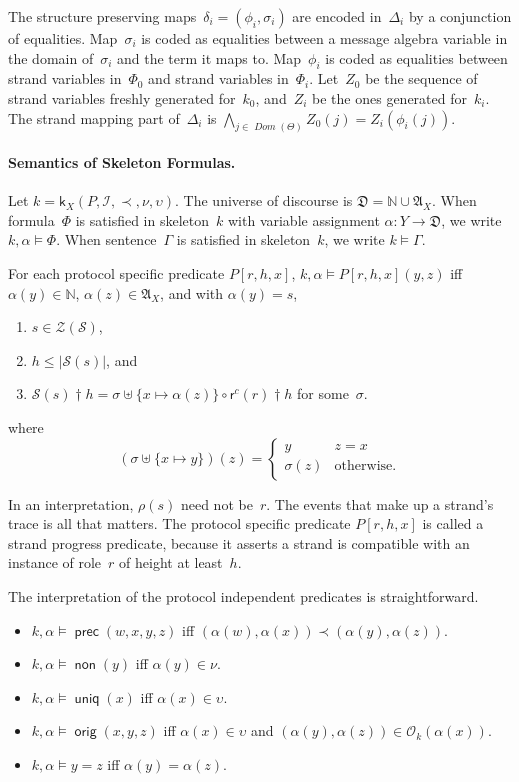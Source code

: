 \documentclass[12pt]{article}
\newcommand{\cn}[1]{\ensuremath{\operatorname{\mathsf{#1}}}}
\newcommand{\fn}[1]{\ensuremath{\operatorname{\mathit{#1}}}}
\newcommand{\sdom}{\fn{Dom}}
\newcommand{\prefix}[2]{#1\dagger#2}
\newcommand{\nat}{\ensuremath{\mathbb{N}}}
\newcommand{\alg}[1]{\ensuremath{\mathfrak{#1}}}
\newcommand{\msg}{\alg{A}}
\newcommand{\ssp}{\ensuremath{\mathcal{S}}}
\newcommand{\strands}{\ensuremath{\mathcal{Z}}}
\newcommand{\rl}{\ensuremath{\rho}}
\newcommand{\skel}{\mathsf{k}}
\newcommand{\insts}{\mathcal{I}}
\newcommand{\role}{\mathsf{r}}
\newcommand{\orig}{\mathcal{O}}
\begin{document}
The structure preserving maps~$\delta_i=(\phi_i,\sigma_i)$ are encoded
in~$\Delta_i$ by a conjunction of equalities.  Map~$\sigma_i$ is coded
as equalities between a message algebra variable in the domain
of~$\sigma_i$ and the term it maps to.  Map~$\phi_i$ is coded as
equalities between strand variables in~$\Phi_0$ and strand variables
in~$\Phi_i$.  Let~$Z_0$ be the sequence of strand variables freshly
generated for~$k_0$, and~$Z_i$ be the ones generated for~$k_i$.  The
strand mapping part of~$\Delta_i$ is
$\bigwedge_{j\in\sdom(\Theta)}Z_0(j)=Z_i(\phi_i(j))$.

\paragraph{Semantics of Skeleton Formulas.}

Let $k=\skel_X(P,\insts,\prec,\nu,\upsilon)$.  The universe of discourse is
$\alg{D}=\nat\cup\msg_X$.  When formula~$\Phi$ is satisfied in
skeleton~$k$ with variable assignment $\alpha\colon Y\to \alg{D}$, we
write $k,\alpha\models\Phi$.  When sentence~$\Gamma$ is satisfied in
skeleton~$k$, we write $k\models\Gamma$.

For each protocol specific predicate $P[r,h,x]$, $k,\alpha\models
P[r,h,x](y,z)$ iff $\alpha(y)\in\nat$, $\alpha(z)\in\msg_X$, and with
$\alpha(y)=s$,

\begin{enumerate}
\item $s\in\strands(\ssp)$,
\item $h\leq|\ssp(s)|$, and
\item $\prefix{\ssp(s)}{h}=\sigma\uplus\{x\mapsto\alpha(z)\}\circ
  \prefix{\role^c(r)}{h}$ for some~$\sigma$.
\end{enumerate}
where \[(\sigma\uplus\{x\mapsto y\})(z)=
\left\{
\begin{array}{ll}
y&z=x\\
\sigma(z)&\mbox{otherwise.}
\end{array}\right.\]

In an interpretation, $\rl(s)$ need not be~$r$.  The events that make
up a strand's trace is all that matters.  The protocol specific
predicate $P[r,h,x]$ is called a strand progress predicate, because it
asserts a strand is compatible with an instance of role~$r$ of height
at least~$h$.

The interpretation of the protocol independent predicates is
straightforward.
\begin{itemize}
\item $k,\alpha\models\cn{prec}(w,x,y,z)$ iff
$(\alpha(w),\alpha(x))\prec(\alpha(y),\alpha(z))$.
\item $k,\alpha\models\cn{non}(y)$ iff $\alpha(y)\in\nu$.
\item $k,\alpha\models\cn{uniq}(x)$ iff $\alpha(x)\in\upsilon$.
\item $k,\alpha\models\cn{orig}(x,y,z)$ iff $\alpha(x)\in\upsilon$ and
  $(\alpha(y),\alpha(z))\in\orig_k(\alpha(x))$.
\item $k,\alpha\models y=z$ iff $\alpha(y)=\alpha(z)$.
\end{itemize}
\end{document}
